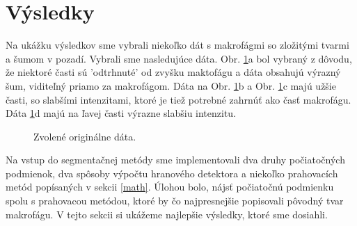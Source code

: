 \documentclass[a4paper,11pt,oneside]{article}%
\begin{document}
\newpage
\section{Výsledky}

Na ukážku výsledkov sme vybrali niekoľko dát s makrofágmi so zložitými tvarmi a šumom v pozadí. Vybrali sme nasledujúce dáta. Obr. \ref{fig:ogData}a bol vybraný z dôvodu, že niektoré časti sú 'odtrhnuté' od zvyšku maktofágu  a dáta obsahujú výrazný šum, viditeľný priamo za makrofágom. Dáta na Obr. \ref{fig:ogData}b a Obr. \ref{fig:ogData}c majú užšie časti, so slabšími intenzitami, ktoré je tiež potrebné zahrnúť ako časť makrofágu. Dáta \ref{fig:ogData}d majú na ľavej časti výrazne slabšiu intenzitu.

\begin{figure}[h!]  
    \hspace{5px}
    \hspace{5px}
    \hspace{5px}
    \caption{Zvolené originálne dáta.}
    \label{fig:ogData}
\end{figure}

Na vstup do segmentačnej metódy sme implementovali dva druhy počiatočných podmienok, dva spôsoby výpočtu hranového detektora a niekoľko prahovacích metód popísaných v sekcii \ref{math}. Úlohou bolo, nájsť počiatočnú podmienku spolu s prahovacou metódou, ktoré by čo najpresnejšie popisovali pôvodný tvar makrofágu. V tejto sekcii si ukážeme najlepšie výsledky, ktoré sme dosiahli.
\end{document}
